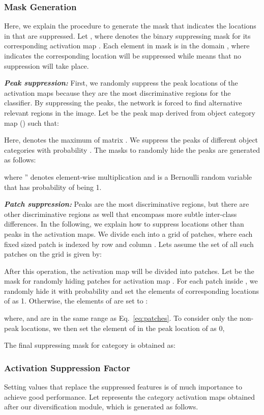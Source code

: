 \documentclass[letterpaper]{article} \usepackage{aaai20}  \usepackage{times}  \usepackage{helvet} \usepackage{courier}  \usepackage[hyphens]{url}  \usepackage{graphicx} \usepackage{multirow}
\begin{document}
\subsubsection{Mask Generation} \label{sup_loca}
Here, we explain the procedure to generate the mask that indicates the locations in  that are suppressed. Let , where  denotes the binary suppressing mask for its corresponding activation map . Each element in mask  is in the domain , where  indicates the corresponding location will be suppressed while  means that no suppression will take place.

\textbf{\textit{Peak suppression:}} First, we randomly suppress the peak locations of the activation maps because they are the most discriminative regions for the classifier. By suppressing the peaks, the network is forced to find alternative relevant regions in the image. Let  be the peak map derived from  object category map () such that:

Here,  denotes the maximum of matrix . We suppress the peaks of different object categories with probability . The masks  to randomly hide the peaks are generated as follows:

where '' denotes element-wise multiplication and  is a Bernoulli random variable that has  probability of being 1.

\textbf{\textit{Patch suppression:}}
Peaks are the most discriminative regions, but there are other discriminative regions as well that encompass more subtle inter-class differences. In the following, we explain how to suppress locations other than peaks in the activation maps. We divide each  into a grid of patches, where each fixed sized patch  is indexed by row  and column . Lets assume the set of all such patches on the grid is given by:

After this operation, the activation map  will be divided into  patches. Let  be the mask for randomly hiding patches for  activation map .  For each patch inside , we randomly hide it with probability  and set the elements of corresponding locations of  as 1. Otherwise, the elements of  are set to :

where,  and  are in the same range as Eq.~\ref{eq:patches}. To consider only the non-peak locations, we then set the element of  in the peak location of  as 0,

The final suppressing mask for  category is obtained as:






\subsubsection{Activation Suppression Factor}\label{sup_values}
Setting values that replace the suppressed features is of much importance to achieve good performance. Let  represents the category activation maps obtained after our diversification module, which is generated as follows.
\end{document}
